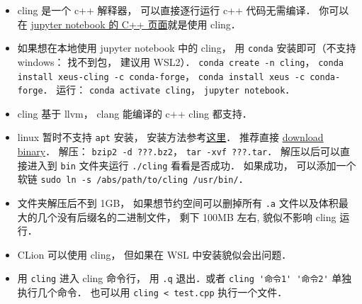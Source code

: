 
\begin{issues}
\issueDraft
\end{issues}

\begin{itemize}
\item cling 是一个 c++ 解释器， 可以直接逐行运行 c++ 代码无需编译． 你可以在 \href{https://jupyter.org/try}{jupyter notebook 的 C++ 页面}就是使用 cling．
\item 如果想在本地使用 jupyter notebook 中的 cling， 用 \verb|conda| 安装即可（不支持 windows： 找不到包， 建议用 WSL2）． \verb|conda create -n cling|， \verb|conda install xeus-cling -c conda-forge|， \verb|conda install xeus -c conda-forge|． 运行： \verb|conda activate cling|， \verb|jupyter notebook|．
\item cling 基于 llvm， clang 能编译的 c++ cling 都支持．
\item linux 暂时不支持 \verb|apt| 安装， 安装方法参考\href{https://kaustubh13.medium.com/how-to-install-cling-on-linux-or-wsl-8125798ed9b9}{这里}． 推荐直接 \href{https://root.cern/download/cling/}{download binary}． 解压： \verb|bzip2 -d ???.bz2|， \verb|tar -xvf ???.tar|． 解压以后可以直接进入到 \verb|bin| 文件夹运行 \verb|./cling| 看看是否成功． 如果成功， 可以添加一个软链 \verb|sudo ln -s /abs/path/to/cling /usr/bin/|．
\item 文件夹解压后不到 1GB， 如果想节约空间可以删掉所有 \verb|.a| 文件以及体积最大的几个没有后缀名的二进制文件， 剩下 100MB 左右, 貌似不影响 cling 运行．
\item CLion 可以使用 cling， 但如果在 WSL 中安装貌似会出问题．
\item 用 \verb|cling| 进入 cling 命令行， 用 \verb|.q| 退出．或者 \verb|cling '命令1' '命令2'| 单独执行几个命令． 也可以用 \verb|cling < test.cpp| 执行一个文件．
\end{itemize}
